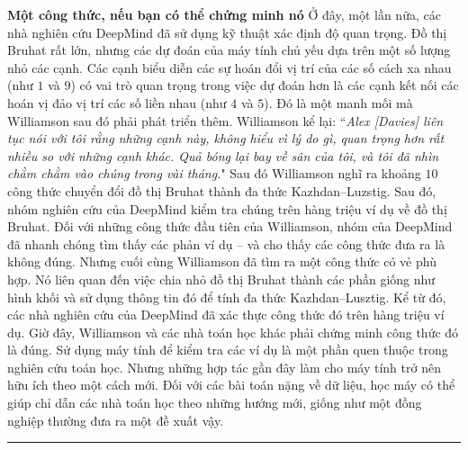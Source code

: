 \begin{multicols}{2}
	\vskip 0.05cm
	\textbf{\color{duongvaotoanhoc}Một công thức, nếu bạn có thể chứng minh nó}
	\vskip 0.05cm
	Ở đây, một lần nữa, các nhà nghiên cứu DeepMind đã sử dụng kỹ thuật xác định độ quan trọng. Đồ thị Bruhat rất lớn, nhưng các dự đoán của máy tính chủ yếu dựa trên một số lượng nhỏ các cạnh. Các cạnh biểu diễn các sự hoán đổi vị trí của các số cách xa nhau (như $1$ và $9$) có vai trò quan trọng trong việc dự đoán hơn là các cạnh kết nối các hoán vị đảo vị trí các số liền nhau (như $4$ và $5$). Đó là một manh mối mà Williamson sau đó phải phát triển thêm.
	\vskip 0.05cm
	Williamson kể lại: ``\textit{Alex [Davies] liên tục nói với tôi rằng những cạnh này, không hiểu vì lý do gì, quan trọng hơn rất nhiều so với những cạnh khác. Quả bóng  lại bay về sân  của tôi, và tôi đã nhìn chằm chằm vào chúng trong vài tháng.}"
	\vskip 0.05cm
	Sau đó Williamson nghĩ ra khoảng $10$ công thức chuyển đổi đồ thị Bruhat thành đa thức Kazhdan--Luzstig. Sau đó, nhóm nghiên cứu của DeepMind kiểm tra chúng trên hàng triệu ví dụ về đồ thị Bruhat. Đối với những công thức đầu tiên của Williamson, nhóm của DeepMind đã nhanh chóng tìm thấy các phản ví dụ -- và cho thấy các công thức đưa ra là không đúng.
	\vskip 0.05cm
	Nhưng cuối cùng Williamson đã tìm ra một công thức có vẻ phù hợp. Nó liên quan đến việc chia nhỏ đồ thị Bruhat thành các phần giống như hình khối và sử dụng thông tin đó để tính đa thức Kazhdan--Lusztig. Kể từ đó, các nhà nghiên cứu của DeepMind đã xác thực công thức đó trên hàng triệu ví dụ. Giờ đây, Williamson và các nhà toán học khác phải chứng minh công thức đó là đúng.
	\vskip 0.05cm
	Sử dụng máy tính để kiểm tra các ví dụ là một phần quen thuộc trong nghiên cứu toán học. Nhưng những hợp tác gần đây làm cho máy tính trở nên hữu ích theo một cách mới. Đối với các bài toán nặng về dữ liệu, học máy có thể giúp chỉ dẫn các nhà toán học theo những hướng mới, giống như một đồng nghiệp thường đưa ra một đề xuất vậy.
\end{multicols}
\vspace*{-10pt}
\rule{1\linewidth}{0.1pt}
\begingroup
